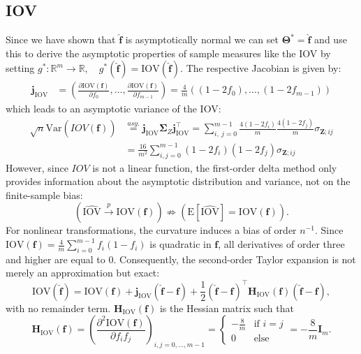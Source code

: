 ﻿\documentclass[12pt,a4paper]{scrreprt}
\theoremstyle{definition}
\begin{document}
\subsection*{IOV}
Since we have shown that $\boldsymbol{\hat{f}}$ is asymptotically normal we can set $\boldsymbol{\Theta^*} = \hat{\boldsymbol{f}}$ and use this to derive the asymptotic properties of sample measures like the IOV by setting $g^*: \mathbb{R}^m \rightarrow \mathbb{R}, \quad g^*(\hat{\boldsymbol{f}}) = \mathrm{IOV}(\hat{\boldsymbol{f}})$. The respective Jacobian is given by:
\begin{align*}
\boldsymbol{j}_{\mathrm{IOV}} &= \left(\frac{\partial \mathrm{IOV}(\boldsymbol{f})}{\partial f_0 }, \ldots, \frac{\partial \mathrm{IOV}(\boldsymbol{f})}{\partial f_{m-1} }\right) = \frac{4}{m}\left((1- 2 f_0), \ldots,(1-2f_{m-1}) \right)
\end{align*}
which leads to an asymptotic variance of the IOV:
\begin{align*}
    \sqrt{n}\mathrm{Var}(\widehat{IOV(\boldsymbol{f})}) &\overset{asy.}{=} \boldsymbol{j}_{\mathrm{IOV}} \boldsymbol{\Sigma}_Z \boldsymbol{j}_{\mathrm{IOV}}^{\top} = \sum_{i, ~j =0}^{m-1}  \frac{4(1- 2 f_i)}{m} \frac{4(1- 2 f_j)}{m} \sigma_{\boldsymbol{Z}; ij}\\
    &= \frac{16}{m^2} \sum_{i,j = 0}^{m-1} (1-2f_i)(1- 2 f_j) \sigma_{\boldsymbol{Z}; ij}
\end{align*}
However, since $IOV$ is not a linear function, the first-order delta method only provides information about the asymptotic distribution and variance, not on the finite-sample bias:
\[(\widehat{\mathrm{IOV}} \overset{p}{\rightarrow} \mathrm{IOV}(\boldsymbol{f})) \not\Rightarrow (\mathrm{E}[\widehat{\mathrm{IOV}}] = \mathrm{IOV}(\boldsymbol{f})).\]
For nonlinear transformations, the curvature induces a bias of order $n^{-1}$. Since
$\mathrm{IOV}(\boldsymbol{f}) = \frac{4}{m}\sum_{i=0}^{m-1}f_i(1-f_i)$ is quadratic in $\boldsymbol{f}$, all derivatives of order three and higher are equal to 0. Consequently, the second-order Taylor expansion is not merely an
approximation but exact:
\[
\mathrm{IOV}(\hat{\boldsymbol{f}}) = \mathrm{IOV}(\boldsymbol{f}) 
+ \boldsymbol{j}_{\mathrm{IOV}}(\hat{\boldsymbol{f}} - \boldsymbol{f}) 
+ \frac{1}{2}(\hat{\boldsymbol{f}}-\boldsymbol{f})^\top 
\boldsymbol{H}_{\mathrm{IOV}}(\boldsymbol{f})(\hat{\boldsymbol{f}}-\boldsymbol{f}),
\]
with no remainder term. $\boldsymbol{H}_{\mathrm{IOV}}(\boldsymbol{f})$
is the Hessian matrix such that\[\boldsymbol{H}_{\mathrm{IOV}}(\boldsymbol{f}) = \left(\frac{\partial^2 \mathrm{IOV}(\boldsymbol{f})}{\partial f_i f_j}\right)_{i,j = 0, \ldots, m-1} = \begin{cases}
    -\frac{8}{m} & \text{if } i = j\\
    0 & \text{else}
\end{cases} = -\frac{8}{m} \boldsymbol{I}_m.\]
\end{document}
